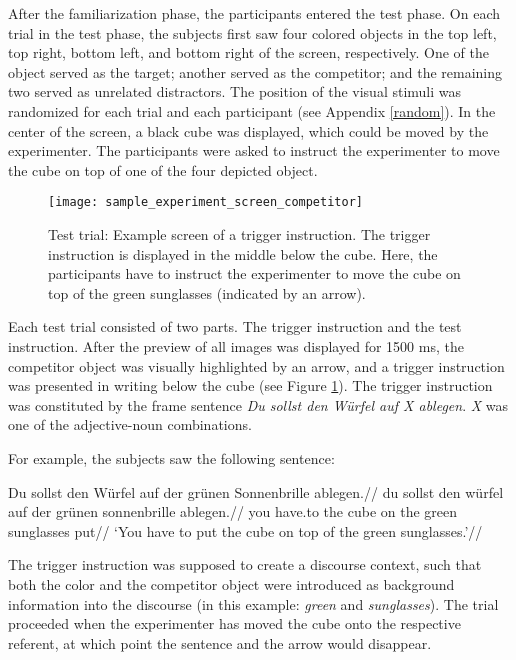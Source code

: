 \documentclass[
]{article}
\begin{document}
After the familiarization phase, the participants entered the test phase.
On each trial in the test phase, the subjects first saw four colored objects in the top left, top right, bottom left, and bottom right of the screen, respectively.
One of the object served as the target; another served as the competitor; and the remaining two served as unrelated distractors.
The position of the visual stimuli was randomized for each trial and each participant (see Appendix \ref{random}).
In the center of the screen, a black cube was displayed, which could be moved by the experimenter.
The participants were asked to instruct the experimenter to move the cube on top of one of the four depicted object.

\begin{figure}[tbp]

{\centering \texttt{[image: sample\_experiment\_screen\_competitor]} 

}

\caption{Test trial: Example screen of a trigger instruction. The trigger instruction is displayed in the middle below the cube. Here, the participants have to instruct the experimenter to move the cube on top of the green sunglasses (indicated by an arrow).}\label{fig:image1}
\end{figure}

Each test trial consisted of two parts.
The trigger instruction and the test instruction.
After the preview of all images was displayed for 1500 ms, the competitor object was visually highlighted by an arrow, and a trigger instruction was presented in writing below the cube (see Figure \ref{fig:image1}).
The trigger instruction was constituted by the frame sentence \emph{Du sollst den Würfel auf X ablegen}.
\emph{X} was one of the adjective-noun combinations.

For example, the subjects saw the following sentence:

\ex \begingl
\glpreamble Du sollst den Würfel auf der grünen Sonnenbrille ablegen.//
\gla du sollst den würfel auf der grünen sonnenbrille ablegen.//
\glb you have.to the cube on the green sunglasses put//
\glft `You have to put the cube on top of the green sunglasses.'//
\endgl \xe

The trigger instruction was supposed to create a discourse context, such that both the color and the competitor object were introduced as background information into the discourse (in this example: \emph{green} and \emph{sunglasses}).
The trial proceeded when the experimenter has moved the cube onto the respective referent, at which point the sentence and the arrow would disappear.
\end{document}
